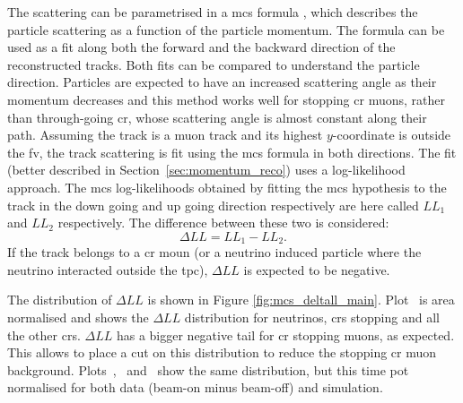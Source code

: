 The scattering can be parametrised in a \acrshort{mcs} formula \cite{mcs}, which describes the particle scattering as a function of the particle momentum. The formula can be used as a fit along both the forward and the backward direction of the reconstructed tracks. Both fits can be compared to understand the particle direction. Particles are expected to have an increased scattering angle as their momentum decreases and this method works well for stopping \acrshort{cr} muons, rather than through-going \acrshort{cr}, whose scattering angle is almost constant along their path. Assuming the track is a muon track and its highest $y$-coordinate is outside the \acrshort{fv}, the track scattering is fit using the \acrshort{mcs} formula in both directions. The fit (better described in Section~\ref{sec:momentum_reco}) uses a log-likelihood approach. The \acrshort{mcs} log-likelihoods obtained by fitting the \acrshort{mcs} hypothesis to the track in the down going and up going direction respectively are here called $LL_1$ and $LL_2$ respectively. The difference between these two is considered:
\begin{equation}
\Delta LL = LL_1 - LL_2.
\end{equation}
If the track belongs to a \acrshort{cr} moun (or a neutrino induced particle where the neutrino interacted outside the \acrshort{tpc}), $\Delta LL$ is expected to be negative. 

The distribution of $\Delta LL$ is shown in Figure \ref{fig:mcs_deltall_main}. Plot~\protect{} is area normalised and shows the $\Delta LL$ distribution for neutrinos, \acrshort{cr}s stopping and all the other \acrshort{cr}s. $\Delta LL$ has a bigger negative tail for \acrshort{cr} stopping muons, as expected. This allows to place a cut on this distribution to reduce the stopping \acrshort{cr} muon background. Plots~\protect{},~\protect{} and~\protect{} show the same distribution, but this time \acrshort{pot} normalised for both data (beam-on minus beam-off) and simulation.

